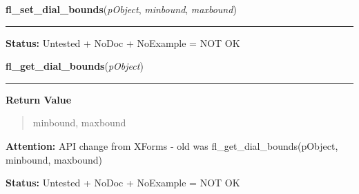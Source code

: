     \vspace{0.5ex}

\hspace{.8\funcindent}\begin{boxedminipage}{\funcwidth}

    \raggedright \textbf{fl\_set\_dial\_bounds}(\textit{pObject}, \textit{minbound}, \textit{maxbound})

    \vspace{-1.5ex}

    \rule{\textwidth}{0.5\fboxrule}
\setlength{\parskip}{2ex}
\setlength{\parskip}{1ex}
\textbf{Status:} Untested + NoDoc + NoExample = NOT OK



    \end{boxedminipage}

    \label{xformslib:library:fl_get_dial_bounds}

    \vspace{0.5ex}

\hspace{.8\funcindent}\begin{boxedminipage}{\funcwidth}

    \raggedright \textbf{fl\_get\_dial\_bounds}(\textit{pObject})

    \vspace{-1.5ex}

    \rule{\textwidth}{0.5\fboxrule}
\setlength{\parskip}{2ex}
\setlength{\parskip}{1ex}
      \textbf{Return Value}
    \vspace{-1ex}

      \begin{quote}
      minbound, maxbound

      \end{quote}

\textbf{Attention:} API change from XForms - old was fl\_get\_dial\_bounds(pObject, minbound, 
maxbound)



\textbf{Status:} Untested + NoDoc + NoExample = NOT OK



    \end{boxedminipage}

    \label{xformslib:library:fl_set_dial_step}

